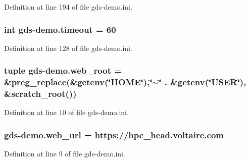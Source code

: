 Definition at line 194 of file gds-\/demo.\-ini.

\hypertarget{namespacegds-demo_a27ea9d5cc2fbb766234415c706092c57}{
\subsubsection[{timeout}]{\setlength{\rightskip}{0pt plus 5cm}int gds-\/demo.\-timeout = 60}}\label{namespacegds-demo_a27ea9d5cc2fbb766234415c706092c57}


Definition at line 128 of file gds-\/demo.\-ini.

\hypertarget{namespacegds-demo_aa8573740e3b2e7a32c35d743695d3748}{
\subsubsection[{web\-\_\-root}]{\setlength{\rightskip}{0pt plus 5cm}tuple gds-\/demo.\-web\-\_\-root = \&preg\-\_\-replace(\&getenv(\char`\"{}H\-O\-M\-E\char`\"{}),\char`\"{}$\sim$\char`\"{} . \&getenv(\char`\"{}U\-S\-E\-R\char`\"{}), \&scratch\-\_\-root())}}\label{namespacegds-demo_aa8573740e3b2e7a32c35d743695d3748}


Definition at line 10 of file gds-\/demo.\-ini.

\hypertarget{namespacegds-demo_adc1de3305ccc0c692368fda2622c819f}{
\subsubsection[{web\-\_\-url}]{\setlength{\rightskip}{0pt plus 5cm}gds-\/demo.\-web\-\_\-url = https\-://hpc\-\_\-head.\-voltaire.\-com}}\label{namespacegds-demo_adc1de3305ccc0c692368fda2622c819f}


Definition at line 9 of file gds-\/demo.\-ini.

